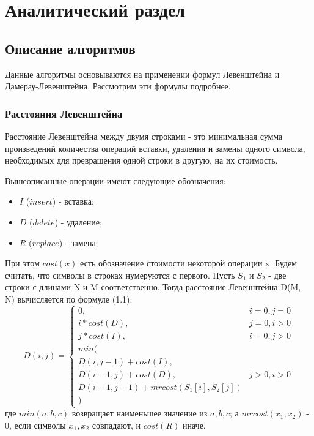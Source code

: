 \chapter{Аналитический раздел}
\label{cha:analysis}

\section{Описание алгоритмов}

Данные алгоритмы основываются на применении формул Левенштейна и Дамерау-Левенштейна. Рассмотрим эти формулы подробнее.

\subsection{Расстояния Левенштейна}

Расстояние Левенштейна между двумя строками - это минимальная сумма произведений количества операций вставки, удаления и замены одного символа, необходимых для превращения одной строки в другую, на их стоимость.

Вышеописанные операции имеют следующие обозначения:
\begin{itemize}
    \item $I$ ($insert$) - вставка;
    \item $D$ ($delete$) - удаление;
    \item $R$ ($replace$) - замена;
\end{itemize}

При этом $cost(x)$ есть обозначение стоимости некоторой операции x. Будем считать, что символы в строках нумеруются с первого. Пусть $S_{1}$ и $S_{2}$ - две строки с длинами N и M соответственно. Тогда расстояние Левенштейна D(M, N) вычисляется по формуле (1.1):
\begin{equation}
D(i,j) = \left\{ \begin{array}{ll}
 0, & \textrm{$i = 0, j = 0$}\\
 i * cost(D), & \textrm{$j = 0, i > 0$}\\
 j * cost(I), & \textrm{$i = 0, j > 0$}\\
min(\\
D(i,j-1) + cost(I),\\
D(i-1, j) + cost(D), &\textrm{$j > 0, i > 0$}\\
D(i-1, j-1) + mrcost(S_1[i], S_2[j])\\
)
  \end{array} \right.
\end{equation}
где $min(a, b, c)$ возвращает наименьшее значение из $a, b, c$; а $mrcost(x_1, x_2)$ - 0, если символы $x_1, x_2$ совпадают, и $cost(R)$ иначе.

